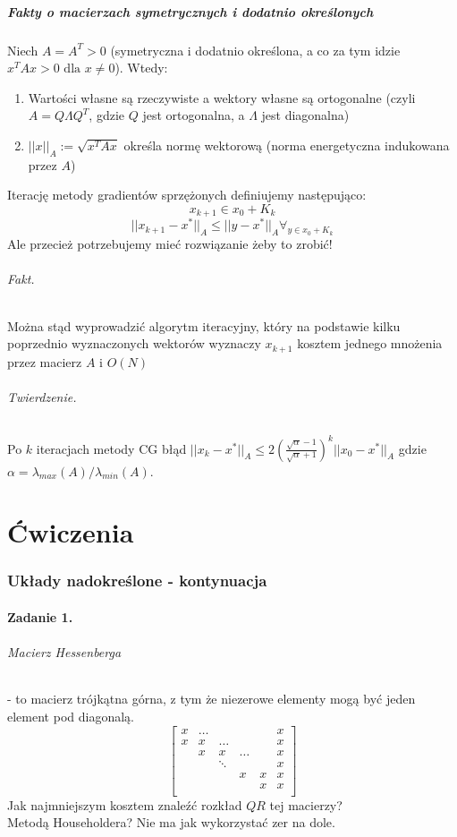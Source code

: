 \documentclass{article}
\begin{document}
\subsubsection{Fakty o macierzach symetrycznych i dodatnio określonych}  

Niech $A = A^T>0$ (symetryczna i dodatnio określona, a co za tym idzie $x^TAx>0\text{ dla }x\not=0$). Wtedy:
\begin{enumerate}
	\item Wartości własne są rzeczywiste a wektory własne są ortogonalne (czyli $ A=Q\Lambda Q^T $, gdzie $ Q $ jest ortogonalna, a $ \Lambda $ jest diagonalna)
	\item $ ||x||_A:=\sqrt{x^TAx} $ określa normę wektorową (norma energetyczna indukowana przez $ A $)
\end{enumerate}
Iterację metody gradientów sprzężonych definiujemy następująco:
$$ x_{k+1}\in x_0 + K_k $$
$$ ||x_{k+1}-x^*||_A\leq ||y-x^*||_A\forall_{y\in x_0+K_k} $$
Ale przecież potrzebujemy mieć rozwiązanie żeby to zrobić!
\paragraph{Fakt.} Można stąd wyprowadzić algorytm iteracyjny, który na podstawie kilku poprzednio wyznaczonych wektorów wyznaczy $ x_{k+1} $ kosztem jednego mnożenia przez macierz $ A $ i $ O(N) $
\paragraph{Twierdzenie.} Po $ k $ iteracjach metody CG błąd $ ||x_k-x^*||_A \leq 2(\frac{\sqrt{\alpha}-1}{\sqrt{\alpha}+1})^k ||x_0-x^*||_A $
gdzie $ \alpha = \lambda_{max}(A)/\lambda_{min}(A) $.




\part{Ćwiczenia}
\section{Układy nadokreślone - kontynuacja}
\subsection{Zadanie 1.}
\paragraph{Macierz Hessenberga} - to macierz trójkątna górna, z tym że niezerowe elementy mogą być jeden element pod diagonalą.
$$\begin{bmatrix}
	x&\ldots&&&&x\\
	x&x&\ldots&&&x\\
	&x&x&\ldots&&x\\
	&&\ddots&&&x\\
	&&&x&x&x\\
	&&&&x&x\\
\end{bmatrix}$$
Jak najmniejszym kosztem znaleźć rozkład $ QR $ tej macierzy?\\
Metodą Householdera? Nie ma jak wykorzystać zer na dole.
\end{document}
